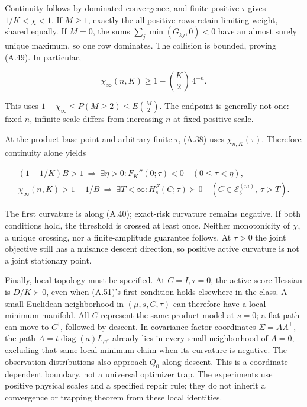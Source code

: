 \documentclass{article}
\begin{document}
Continuity follows by dominated convergence, and finite positive
\(\tau\) gives \(1/K<\chi<1\). If \(M\ge1\), exactly the all-positive
rows retain limiting weight, shared equally. If \(M=0\), the sums
\(\sum_j\min(G_{kj},0)<0\) have an almost surely unique maximum, so one
row dominates. The collision is bounded, proving (A.49). In particular,

\[
\chi_\infty(n,K)\ge1-\binom K2\,4^{-n}.
\tag{A.50}
\]

This uses \(1-\chi_\infty\le P(M\ge2)\le E\binom M2\). The endpoint is
generally not one: fixed \(n\), infinite scale differs from increasing
\(n\) at fixed positive scale.

At the product base point and arbitrary finite \(\tau\), (A.38) uses
\(\chi_{n,K}(\tau)\). Therefore continuity alone yields

\[
\begin{gathered}
(1-1/K)B>1\ \Longrightarrow\ \exists\eta>0:
\overline F_K''(0;\tau)<0\quad(0\le\tau<\eta),\\
\chi_\infty(n,K)>1-1/B\ \Longrightarrow\ \exists T<\infty:
H_s^F(C;\tau)\succ0\quad(C\in\mathcal E_\delta^{(m)},\ \tau>T).
\end{gathered}
\tag{A.51}
\]

The first curvature is along (A.40); exact-risk curvature remains
negative. If both conditions hold, the threshold is crossed at least
once. Neither monotonicity of \(\chi\), a unique crossing, nor a
finite-amplitude guarantee follows. At \(\tau>0\) the joint objective
still has a nuisance descent direction, so positive active curvature is
not a joint stationary point.

Finally, local topology must be specified. At \(C=I,\tau=0\), the active
score Hessian is \(D/K\succ0\), even when (A.51)'s first condition holds
elsewhere in the class. A small Euclidean neighborhood in
\((\mu,s,C,\tau)\) can therefore have a local minimum manifold. All
\(C\) represent the same product model at \(s=0\); a flat path can move
to \(C^\dagger\), followed by descent. In covariance-factor coordinates
\(\Sigma=AA^\top\), the path \(A=t\operatorname{diag}(a)L_{C^\dagger}\)
already lies in every small neighborhood of \(A=0\), excluding that same
local-minimum claim when its curvature is negative. The observation
distributions also approach \(Q_0\) along descent. This is a
coordinate-dependent boundary, not a universal optimizer trap. The
experiments use positive physical scales and a specified repair rule;
they do not inherit a convergence or trapping theorem from these local
identities.
\end{document}

